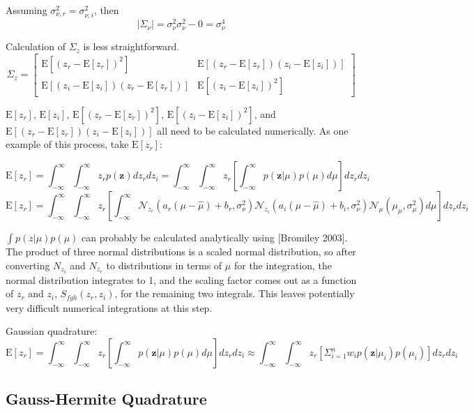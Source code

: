 \documentclass{article}         %
\theoremstyle{definition}
\theoremstyle{remark}
\newcommand{\eq}[1]{\begin{equation} #1 \end{equation}}
\newcommand{\zbf}{\mathbf{z}}
\newcommand{\zcond}{\mathbf{z}|\mu}
\newcommand{\Nscript}{\mathcal{N}}
\newcommand{\paren}[1]{\left(#1\right)}
\newcommand{\bracket}[1]{\left[#1\right]}
\newcommand{\expect}[1]{\mathrm{E}\left[#1\right]}
\begin{document}
Assuming $\sigma_{\nu,r}^2=\sigma_{\nu,i}^2$, then
\eq{\lvert\Sigma_\nu\rvert = \sigma_\nu^2\sigma_\nu^2-0 = \sigma_\nu^4}

Calculation of $\Sigma_z$ is less straightforward.
\begin{equation}
	\Sigma_z = \left[ \begin{array}{cc}
	\mathrm{E}\left[\left(z_r - \expect{z_r}\right)^2\right] & \mathrm{E}\left[\left(z_r - \expect{z_r}\right)\left(z_i - \expect{z_i}\right)\right] \\
	\mathrm{E}\left[\left(z_i - \expect{z_i}\right)\left(z_r - \expect{z_r}\right)\right] & \mathrm{E}\left[\left(z_i - \expect{z_i}\right)^2\right] \end{array} \right]
\end{equation}

$\expect{z_r}$, $\expect{z_i}$, $\expect{\left(z_r - \expect{z_r}\right)^2}$, $\expect{\left(z_i - \expect{z_i}\right)^2}$, and $\expect{\left(z_r - \expect{z_r}\right)\left(z_i - \expect{z_i}\right)}$ all need to be calculated numerically. As one example of this process, take $\expect{z_r}$:

\eq{\expect{z_r} = \int_{-\infty}^\infty\int_{-\infty}^\infty z_r p\paren{\zbf}dz_rdz_i = \int_{-\infty}^\infty\int_{-\infty}^\infty z_r \bracket{\int_{-\infty}^\infty p\paren{\zcond}p\paren{\mu}d\mu}dz_rdz_i}
\eq{\expect{z_r} = \int_{-\infty}^\infty\int_{-\infty}^\infty z_r \bracket{\int_{-\infty}^\infty \Nscript_{z_r}\paren{a_r\paren{\mu - \hat{\mu}} + b_r,\sigma_\nu^2}\Nscript_{z_i}\paren{a_i\paren{\mu - \hat{\mu}} + b_i,\sigma_\nu^2}\Nscript_\mu\paren{\mu_\mu,\sigma_\mu^2} d\mu}dz_rdz_i}

$\int p(z|\mu)p(\mu)$ can probably be calculated analytically using [Bromiley 2003]. The product of three normal distributions is a scaled normal distribution, so after converting $N_{z_i}$ and $N_{z_r}$ to distributions in terms of $\mu$ for the integration, the normal distribution integrates to 1, and the scaling factor comes out as a function of $z_r$ and $z_i$, $S_{fgh}\paren{z_r,z_i}$, for the remaining two integrals. This leaves potentially very difficult numerical integrations at this step.

Gaussian quadrature:
\eq{\expect{z_r} = \int_{-\infty}^\infty\int_{-\infty}^\infty z_r \bracket{\int_{-\infty}^\infty p\paren{\zcond}p\paren{\mu}d\mu}dz_rdz_i \approx \int_{-\infty}^\infty\int_{-\infty}^\infty z_r \bracket{\Sigma_{i=1}^n w_i p\paren{\zbf|\mu_i}p\paren{\mu_i}}dz_rdz_i} 

\subsection{Gauss-Hermite Quadrature}
\end{document}
